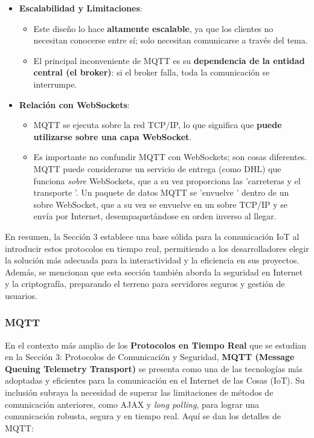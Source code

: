 \documentclass{report}
\begin{document}
\begin{itemize}
    \item \textbf{Escalabilidad y Limitaciones}:
    \begin{itemize}
        \item Este diseño lo hace \textbf{altamente escalable}, ya que los clientes no necesitan conocerse entre sí; solo necesitan comunicarse a 
        través del tema.
        \item El principal inconveniente de MQTT es su \textbf{dependencia de la entidad central (el broker)}: si el broker falla, toda la comunicación 
        se interrumpe.
    \end{itemize}

    \item \textbf{Relación con WebSockets}:
    \begin{itemize}
        \item MQTT se ejecuta sobre la red TCP/IP, lo que significa que \textbf{puede utilizarse sobre una capa WebSocket}.
        \item Es importante no confundir MQTT con WebSockets; son cosas diferentes. MQTT puede considerarse un servicio de entrega (como DHL) que funciona 
        \textit{sobre} WebSockets, que a su vez proporciona las  'carreteras y el transporte '. Un paquete de datos MQTT se  'envuelve ' dentro de un sobre 
        WebSocket, que a su vez se envuelve en un sobre TCP/IP y se envía por Internet, desempaquetándose en orden inverso al llegar.
    \end{itemize}
\end{itemize}
En resumen, la Sección 3 establece una base sólida para la comunicación IoT al introducir estos protocolos en tiempo real, permitiendo a los desarrolladores 
elegir la solución más adecuada para la interactividad y la eficiencia en sus proyectos. Además, se  mencionan que esta sección también aborda 
la seguridad en Internet y la criptografía, preparando el terreno para servidores seguros y gestión de usuarios.

\subsubsection{MQTT}
En el contexto más amplio de los \textbf{Protocolos en Tiempo Real} que se estudian en la Sección 3: Protocolos de Comunicación y Seguridad, 
\textbf{MQTT (Message Queuing Telemetry Transport)} se presenta como una de las tecnologías más adoptadas y eficientes para la comunicación en el 
Internet de las Cosas (IoT). Su inclusión subraya la necesidad de superar las limitaciones de métodos de comunicación anteriores, como AJAX y 
\textit{long polling}, para lograr una comunicación robusta, segura y en tiempo real. Aquí se dan los detalles de MQTT:
\end{document}
